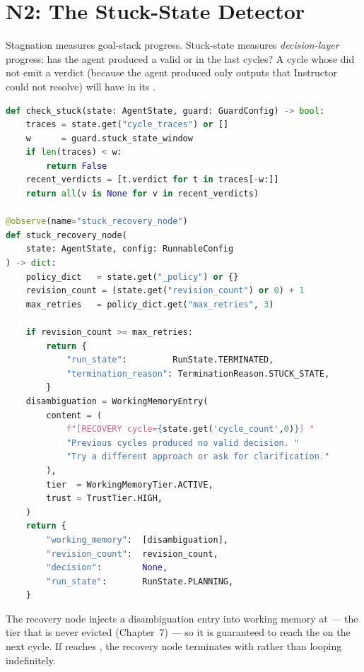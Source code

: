 \section{N2: The Stuck-State Detector}
\label{sec:stuck}

Stagnation measures goal-stack progress.  Stuck-state measures
\emph{decision-layer} progress: has the agent produced a valid
 or  in the last
 cycles?  A cycle whose 
did not emit a verdict (because the agent produced only
 outputs that Instructor could not resolve) will have
 in its .

\begin{lstlisting}[language=Python,
    caption={Stuck-state detector and recovery node (src/guards.py)},
    label={lst:stuck}]
def check_stuck(state: AgentState, guard: GuardConfig) -> bool:
    traces = state.get("cycle_traces") or []
    w      = guard.stuck_state_window
    if len(traces) < w:
        return False
    recent_verdicts = [t.verdict for t in traces[-w:]]
    return all(v is None for v in recent_verdicts)

@observe(name="stuck_recovery_node")
def stuck_recovery_node(
    state: AgentState, config: RunnableConfig
) -> dict:
    policy_dict   = state.get("_policy") or {}
    revision_count = (state.get("revision_count") or 0) + 1
    max_retries   = policy_dict.get("max_retries", 3)

    if revision_count >= max_retries:
        return {
            "run_state":         RunState.TERMINATED,
            "termination_reason": TerminationReason.STUCK_STATE,
        }
    disambiguation = WorkingMemoryEntry(
        content = (
            f"[RECOVERY cycle={state.get('cycle_count',0)}] "
            "Previous cycles produced no valid decision. "
            "Try a different approach or ask for clarification."
        ),
        tier  = WorkingMemoryTier.ACTIVE,
        trust = TrustTier.HIGH,
    )
    return {
        "working_memory":  [disambiguation],
        "revision_count":  revision_count,
        "decision":        None,
        "run_state":       RunState.PLANNING,
    }
\end{lstlisting}

\medskip
The recovery node injects a disambiguation entry into working memory at
 --- the tier that is never evicted
(Chapter~7) --- so it is guaranteed to reach the  on
the next cycle.  If  reaches ,
the recovery node terminates with  rather than looping
indefinitely.


